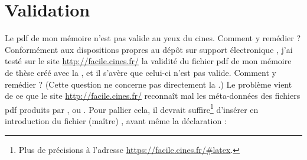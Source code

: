 \section{Validation}
\label{sec-validation}

\begin{dbfaq}{Le \acrshort{pdf} de mon mémoire n'est pas valide au yeux du
    \acrshort{cines}. Comment y remédier ?}{}
  Conformément aux dispositions propres au dépôt sur support électronique
  \autocite{guidoct-abes}, j'ai testé sur le site \url{http://facile.cines.fr/}
  la validité du fichier \acrshort{pdf} de mon mémoire de thèse créé avec la
  \yatCl{}, et il s'avère que celui-ci n'est pas valide. Comment y remédier ?
  \tcblower
  (Cette question ne concerne pas directement la \yatCl{}.) Le problème vient de
  ce que le site \url{http://facile.cines.fr/} reconnaît mal les méta-données
  des fichiers \acrshort{pdf} produits par ,  ou
  .
  Pour pallier cela, il devrait suffire\footnote{Plus de précisions à l'adresse
    \url{https://facile.cines.fr/\#latex}.} d'insérer en introduction du fichier
  (maître) , avant même la déclaration
   :
\begin{preamblecode}[]
\end{preamblecode}
\end{dbfaq}

